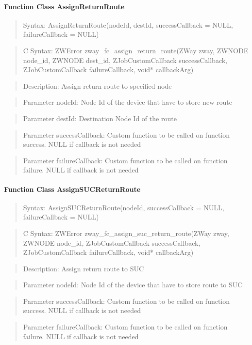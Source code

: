 \paragraph{Function Class AssignReturnRoute}
\begin{quote}Syntax: AssignReturnRoute(nodeId, destId, successCallback = NULL, failureCallback = NULL)\end{quote}
\begin{quote}C Syntax: ZWError zway\_fc\_assign\_return\_route(ZWay zway, ZWNODE node\_id, ZWNODE dest\_id, ZJobCustomCallback successCallback, ZJobCustomCallback failureCallback, void* callbackArg)\end{quote}
\begin{quote}Description: Assign return route to specified node\end{quote}
\begin{quote}Parameter nodeId: Node Id of the device that have to store new route\end{quote}
\begin{quote}Parameter destId: Destination Node Id of the route\end{quote}
\begin{quote}Parameter successCallback: Custom function to be called on function success. NULL if callback is not needed\end{quote}
\begin{quote}Parameter failureCallback: Custom function to be called on function failure. NULL if callback is not needed\end{quote}


\paragraph{Function Class AssignSUCReturnRoute}
\begin{quote}Syntax: AssignSUCReturnRoute(nodeId, successCallback = NULL, failureCallback = NULL)\end{quote}
\begin{quote}C Syntax: ZWError zway\_fc\_assign\_suc\_return\_route(ZWay zway, ZWNODE node\_id, ZJobCustomCallback successCallback, ZJobCustomCallback failureCallback, void* callbackArg)\end{quote}
\begin{quote}Description: Assign return route to SUC\end{quote}
\begin{quote}Parameter nodeId: Node Id of the device that have to store route to SUC\end{quote}
\begin{quote}Parameter successCallback: Custom function to be called on function success. NULL if callback is not needed\end{quote}
\begin{quote}Parameter failureCallback: Custom function to be called on function failure. NULL if callback is not needed\end{quote}



